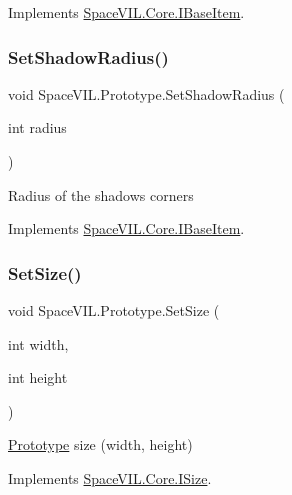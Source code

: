 Implements \mbox{\hyperlink{interface_space_v_i_l_1_1_core_1_1_i_base_item}{Space\+V\+I\+L.\+Core.\+I\+Base\+Item}}.

\mbox{\label{class_space_v_i_l_1_1_prototype_aad83d16c78da2247a6945e49eca1d6a0}} 
\subsubsection{\texorpdfstring{Set\+Shadow\+Radius()}{SetShadowRadius()}}
{\footnotesize\ttfamily void Space\+V\+I\+L.\+Prototype.\+Set\+Shadow\+Radius (\begin{DoxyParamCaption}\item[{int}]{radius }\end{DoxyParamCaption})}



Radius of the shadows corners 



Implements \mbox{\hyperlink{interface_space_v_i_l_1_1_core_1_1_i_base_item}{Space\+V\+I\+L.\+Core.\+I\+Base\+Item}}.

\mbox{\label{class_space_v_i_l_1_1_prototype_a2f7301e72422245f5d0a72422cd48deb}} 
\subsubsection{\texorpdfstring{Set\+Size()}{SetSize()}}
{\footnotesize\ttfamily void Space\+V\+I\+L.\+Prototype.\+Set\+Size (\begin{DoxyParamCaption}\item[{int}]{width,  }\item[{int}]{height }\end{DoxyParamCaption})}



\mbox{\hyperlink{class_space_v_i_l_1_1_prototype}{Prototype}} size (width, height) 



Implements \mbox{\hyperlink{interface_space_v_i_l_1_1_core_1_1_i_size}{Space\+V\+I\+L.\+Core.\+I\+Size}}.

